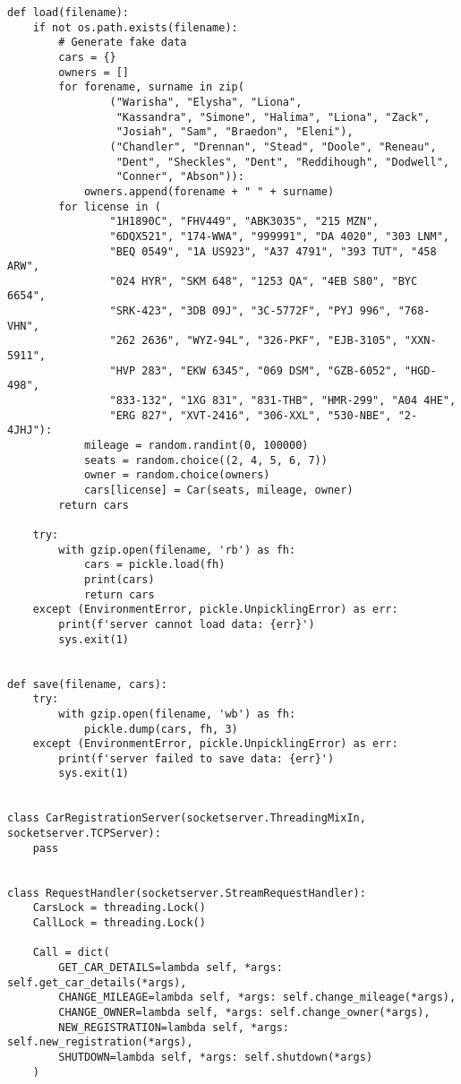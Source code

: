 \begin{lstlisting}
def load(filename):
    if not os.path.exists(filename):
        # Generate fake data
        cars = {}
        owners = []
        for forename, surname in zip(
                ("Warisha", "Elysha", "Liona",
                 "Kassandra", "Simone", "Halima", "Liona", "Zack",
                 "Josiah", "Sam", "Braedon", "Eleni"),
                ("Chandler", "Drennan", "Stead", "Doole", "Reneau",
                 "Dent", "Sheckles", "Dent", "Reddihough", "Dodwell",
                 "Conner", "Abson")):
            owners.append(forename + " " + surname)
        for license in (
                "1H1890C", "FHV449", "ABK3035", "215 MZN",
                "6DQX521", "174-WWA", "999991", "DA 4020", "303 LNM",
                "BEQ 0549", "1A US923", "A37 4791", "393 TUT", "458 ARW",
                "024 HYR", "SKM 648", "1253 QA", "4EB S80", "BYC 6654",
                "SRK-423", "3DB 09J", "3C-5772F", "PYJ 996", "768-VHN",
                "262 2636", "WYZ-94L", "326-PKF", "EJB-3105", "XXN-5911",
                "HVP 283", "EKW 6345", "069 DSM", "GZB-6052", "HGD-498",
                "833-132", "1XG 831", "831-THB", "HMR-299", "A04 4HE",
                "ERG 827", "XVT-2416", "306-XXL", "530-NBE", "2-4JHJ"):
            mileage = random.randint(0, 100000)
            seats = random.choice((2, 4, 5, 6, 7))
            owner = random.choice(owners)
            cars[license] = Car(seats, mileage, owner)
        return cars

    try:
        with gzip.open(filename, 'rb') as fh:
            cars = pickle.load(fh)
            print(cars)
            return cars
    except (EnvironmentError, pickle.UnpicklingError) as err:
        print(f'server cannot load data: {err}')
        sys.exit(1)


def save(filename, cars):
    try:
        with gzip.open(filename, 'wb') as fh:
            pickle.dump(cars, fh, 3)
    except (EnvironmentError, pickle.UnpicklingError) as err:
        print(f'server failed to save data: {err}')
        sys.exit(1)


class CarRegistrationServer(socketserver.ThreadingMixIn, socketserver.TCPServer):
    pass


class RequestHandler(socketserver.StreamRequestHandler):
    CarsLock = threading.Lock()
    CallLock = threading.Lock()

    Call = dict(
        GET_CAR_DETAILS=lambda self, *args: self.get_car_details(*args),
        CHANGE_MILEAGE=lambda self, *args: self.change_mileage(*args),
        CHANGE_OWNER=lambda self, *args: self.change_owner(*args),
        NEW_REGISTRATION=lambda self, *args: self.new_registration(*args),
        SHUTDOWN=lambda self, *args: self.shutdown(*args)
    )


\end{lstlisting}
